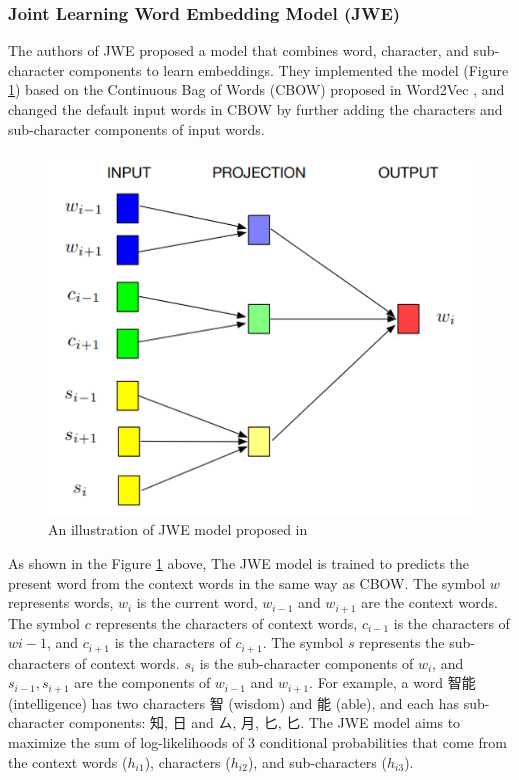 \subsubsection{Joint Learning Word Embedding Model (JWE)}

The authors of JWE \cite{yu2017joint} proposed a model that combines word, character, and sub-character components to learn embeddings. They implemented the model (Figure \ref{fig:jwe}) based on the Continuous Bag of Words (CBOW) proposed in Word2Vec \cite{mikolov2013efficient}, and changed the default input words in CBOW by further adding the characters and sub-character components of input words.

\begin{figure}[h]
	\centering
	\includegraphics[scale=0.7]{../images/jwe_illustration.png}
	\caption{An illustration of JWE model proposed in \cite{yu2017joint}}
	\label{fig:jwe}
\end{figure}

As shown in the Figure \ref{fig:jwe} above, The JWE model is trained to predicts the present word from the context words in the same way as CBOW. The symbol $w$ represents words, $w_i$ is the current word, $w_{i-1}$ and $w_{i+1}$ are the context words. The symbol $c$ represents the characters of context words, $c_{i-1}$ is the characters of $w{i-1}$, and $c_{i+1}$ is the characters of $c_{i+1}$. The symbol $s$ represents the sub-characters of context words. $s_i$ is the sub-character components of $w_i$, and $s_{i-1}, s_{i+1}$ are the components of $w_{i-1}$ and $w_{i+1}$. For example, a word 智能 (intelligence) has two characters 智 (wisdom) and 能 (able), and each has sub-character components: 知, 日 and ㄙ, 月, 匕, 匕. The JWE model aims to maximize the sum of log-likelihoods of 3 conditional probabilities that come from the context words ($h_{i1}$), characters ($h_{i2}$), and sub-characters ($h_{i3}$).

